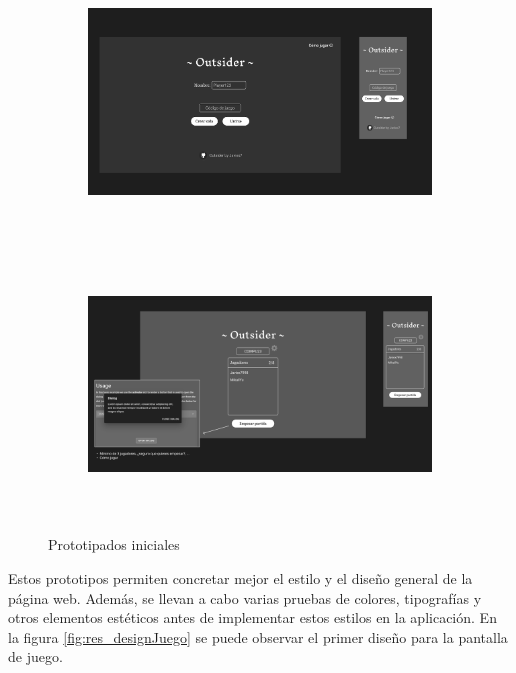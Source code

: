 \begin{figure}[h]													
	\begin{subfigure}{\textwidth}
		\centering
		\includegraphics[height=7cm]{res_designLanding.png}
	\end{subfigure}
																																																																																																																																																																													
	\begin{subfigure}{\textwidth}
		\centering
		\includegraphics[height=7cm]{res_designLobby.png} 
	\end{subfigure}
																																																																																																																																																																																				
	\caption{Prototipados iniciales}
	\label{fig:res_designLanding}										
\end{figure}

Estos prototipos permiten concretar mejor el estilo y el diseño general de la página web. Además, 
se llevan a cabo varias pruebas de colores, tipografías y otros elementos estéticos antes de 
implementar estos estilos en la aplicación. En la figura \ref{fig:res_designJuego} se puede observar el primer diseño para la pantalla
de juego.

